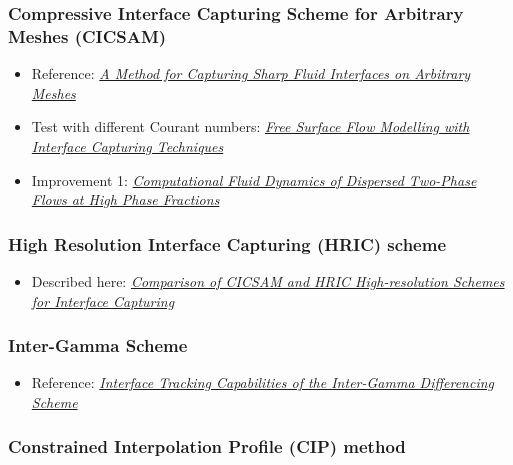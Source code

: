 \documentclass[a4paper]{report}
\begin{document}
\subsubsection{Compressive Interface Capturing Scheme for Arbitrary Meshes (CICSAM)}

\begin{itemize}
    \item Reference: \textit{\href{http://ac.els-cdn.com/S0021999199962769/1-s2.0-S0021999199962769-main.pdf?_tid=85161b57da5f4401e55c9d07495e24ea&acdnat=1336167249_a59e4f578adbacf3bff69936c48cdd57}{A Method for Capturing Sharp Fluid Interfaces on Arbitrary Meshes}}
    \item Test with different Courant numbers: \textit{\href{http://www.marin.nl/upload_mm/8/2/c/1807524470_1999999096_2007-ECCOMAS_HoekstraVazAbeilBunnik.pdf}{Free Surface Flow Modelling with Interface Capturing Techniques}}
    \item Improvement 1: \textit{\href{http://powerlab.fsb.hr/ped/kturbo/openfoam/docs/HenrikRuschePhD2002.pdf}{Computational Fluid Dynamics of Dispersed Two-Phase Flows at High Phase Fractions}}
\end{itemize}

\subsubsection{High Resolution Interface Capturing (HRIC) scheme}

\begin{itemize}
    \item Described here: \textit{\href{http://warminski.pollub.plwww.ptmts.org.pl/Waclaw-Koron-2-08.pdf}{Comparison of CICSAM and HRIC High-resolution Schemes for Interface Capturing}}
\end{itemize}

\subsubsection{Inter-Gamma Scheme}

\begin{itemize}
    \item Reference: \textit{\href{http://powerlab.fsb.hr/ped/kturbo/openfoam/docs/InterTrack.pdf}{Interface Tracking Capabilities of the Inter-Gamma Differencing Scheme}}
\end{itemize}

\subsubsection{Constrained Interpolation Profile (CIP) method}
\end{document}
